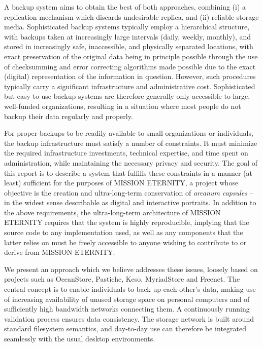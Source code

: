 \documentclass[11pt]{article}
\begin{document}
\begin{mainmatter}
A backup system aims to obtain the best of both approaches, combining (i) a replication mechanism which discards undesirable replica, and (ii) reliable storage media. Sophisticated backup systems typically employ a hierarchical structure, with backups taken at increasingly large intervals (daily, weekly, monthly), and stored in increasingly safe, inaccessible, and physically separated locations, with exact preservation of the original data being in principle possible through the use of checksumming and error correcting algorithms made possible due to the exact (digital) representation of the information in question. However, such procedures typically carry a significant infrastructure and administrative cost. Sophisticated but easy to use backup systems are therefore generally only accessible to large, well-funded organizations, resulting in a situation where most people do not backup their data regularly and properly.

For proper backups to be readily available to small organizations or individuals, the backup infrastructure must satisfy a number of constraints. It must minimize the required infrastructure investments, technical expertise, and time spent on administration, while maintaining the necessary privacy and security. The goal of this report is to describe a system that fulfills these constraints in a manner (at least) sufficient for the purposes of MISSION ETERNITY, a project whose objective is the creation and ultra-long-term conservation of \emph{arcanum capsules} -- in the widest sense describable as digital and interactive portraits. In addition to the above requirements, the ultra-long-term architecture of MISSION ETERNITY requires that the system is highly reproducible, implying that the source code to any implementation used, as well  as any components that the latter relies on must be freely accessible to anyone wishing to contribute to or derive from MISSION ETERNITY.

We present an approach which we believe addresses these issues, loosely based on projects such as OceanStore\cite{oceanstore}, Pastiche\cite{pastiche}, Keso\cite{keso}, MyriadStore\cite{mstore} and Freenet\cite{freenet}. The central concept is to enable individuals to back up each other's data, making use of increasing availability of unused storage space on personal computers and of sufficiently high bandwidth networks  connecting them. A continuously running validation process ensures data consistency. The storage network is built around standard filesystem semantics, and day-to-day use can therefore be integrated seamlessly with the usual desktop environments. 


\end{mainmatter}
\end{document}
